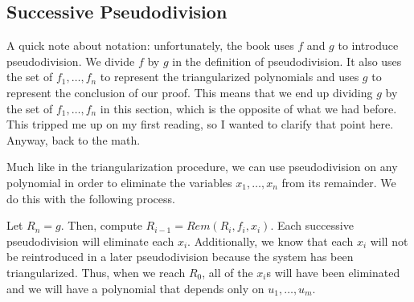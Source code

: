 \documentclass{article}
\theoremstyle{plain}
\theoremstyle{definition}
\theoremstyle{remark}
\begin{document}
\subsection{Successive Pseudodivision}

A quick note about notation: unfortunately, the book uses $f$ and $g$ to introduce pseudodivision. We divide $f$ by $g$ in the definition of pseudodivision.
It also uses the set of $f_1,\dots,f_n$ to represent the triangularized polynomials and uses $g$ to represent the conclusion of our proof.
This means that we end up dividing $g$ by the set of $f_1,\dots,f_n$ in this section, which is the opposite of what we had before. 
This tripped me up on my first reading, so I wanted to clarify that point here. Anyway, back to the math.

Much like in the triangularization procedure, we can use pseudodivision on any polynomial in order to eliminate the variables $x_1,\dots,x_n$ from its remainder.
We do this with the following process.

Let $R_n = g$. Then, compute $R_{i-1} = Rem(R_i,f_i,x_i)$. Each successive pseudodivision will eliminate each $x_i$. 
Additionally, we know that each $x_i$ will not be reintroduced in a later pseudodivision because the system has been triangularized.
Thus, when we reach $R_0$, all of the $x_i$s will have been eliminated and we will have a polynomial that depends only on $u_1,\dots,u_m$.
\end{document}
